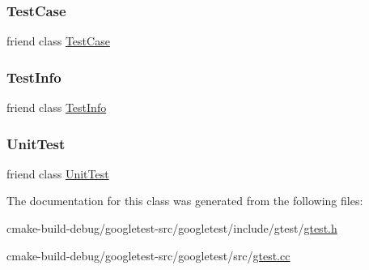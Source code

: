 \mbox{\label{classtesting_1_1TestResult_aff779e55b06adfa7c0088bd10253f0f0}} 
\subsubsection{\texorpdfstring{TestCase}{TestCase}}
{\footnotesize\ttfamily friend class \mbox{\hyperlink{classtesting_1_1TestCase}{Test\+Case}}\hspace{0.3cm}{\ttfamily [friend]}}

\mbox{\label{classtesting_1_1TestResult_a4c49c2cdb6c328e6b709b4542f23de3c}} 
\subsubsection{\texorpdfstring{TestInfo}{TestInfo}}
{\footnotesize\ttfamily friend class \mbox{\hyperlink{classtesting_1_1TestInfo}{Test\+Info}}\hspace{0.3cm}{\ttfamily [friend]}}

\mbox{\label{classtesting_1_1TestResult_a832b4d233efee1a32feb0f4190b30d39}} 
\subsubsection{\texorpdfstring{UnitTest}{UnitTest}}
{\footnotesize\ttfamily friend class \mbox{\hyperlink{classtesting_1_1UnitTest}{Unit\+Test}}\hspace{0.3cm}{\ttfamily [friend]}}



The documentation for this class was generated from the following files\+:\begin{DoxyCompactItemize}
\item 
cmake-\/build-\/debug/googletest-\/src/googletest/include/gtest/\mbox{\hyperlink{gtest_8h}{gtest.\+h}}\item 
cmake-\/build-\/debug/googletest-\/src/googletest/src/\mbox{\hyperlink{gtest_8cc}{gtest.\+cc}}\end{DoxyCompactItemize}
